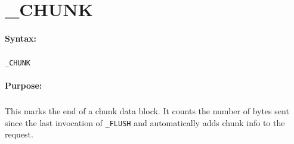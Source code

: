
\newpage
\section{\_CHUNK}
\label{cmd:_CHUNK}

\paragraph{Syntax:}
\subparagraph{}
\texttt{\_CHUNK}

\paragraph{Purpose:}
\subparagraph{}
This marks the end of a chunk data block. It counts the 
number of bytes sent since the last invocation of \texttt{\_FLUSH} 
and automatically adds chunk info to the request.
